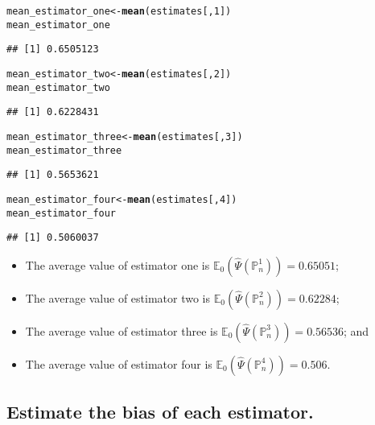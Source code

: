 \documentclass{article}\usepackage[]{graphicx}\usepackage[]{xcolor}
\makeatletter
\newcommand{\hlnum}[1]{\textcolor[rgb]{0.686,0.059,0.569}{#1}}%
\newcommand{\hlstd}[1]{\textcolor[rgb]{0.345,0.345,0.345}{#1}}%
\newcommand{\hlkwb}[1]{\textcolor[rgb]{0.69,0.353,0.396}{#1}}%
\newcommand{\hlkwd}[1]{\textcolor[rgb]{0.737,0.353,0.396}{\textbf{#1}}}%
\newenvironment{kframe}{%
 \def\at@end@of@kframe{}%
 \ifinner\ifhmode%
  \def\at@end@of@kframe{\end{minipage}}%
  \begin{minipage}{\columnwidth}%
 \fi\fi%
 \def\FrameCommand##1{\hskip\@totalleftmargin \hskip-\fboxsep
 \colorbox{shadecolor}{##1}\hskip-\fboxsep
     \hskip-\linewidth \hskip-\@totalleftmargin \hskip\columnwidth}%
 \MakeFramed {\advance\hsize-\width
   \@totalleftmargin\z@ \linewidth\hsize
   \@setminipage}}%
 {\par\unskip\endMakeFramed%
 \at@end@of@kframe}
\newenvironment{knitrout}{}{} %
\makeatother
\begin{document}
\begin{knitrout}
\color{fgcolor}\begin{kframe}
\begin{alltt}
\hlstd{mean_estimator_one} \hlkwb{<-} \hlkwd{mean}\hlstd{(estimates[,}\hlnum{1}\hlstd{])}
\hlstd{mean_estimator_one}
\end{alltt}
\begin{verbatim}
## [1] 0.6505123
\end{verbatim}
\begin{alltt}
\hlstd{mean_estimator_two} \hlkwb{<-} \hlkwd{mean}\hlstd{(estimates[,}\hlnum{2}\hlstd{])}
\hlstd{mean_estimator_two}
\end{alltt}
\begin{verbatim}
## [1] 0.6228431
\end{verbatim}
\begin{alltt}
\hlstd{mean_estimator_three} \hlkwb{<-} \hlkwd{mean}\hlstd{(estimates[,}\hlnum{3}\hlstd{])}
\hlstd{mean_estimator_three}
\end{alltt}
\begin{verbatim}
## [1] 0.5653621
\end{verbatim}
\begin{alltt}
\hlstd{mean_estimator_four} \hlkwb{<-} \hlkwd{mean}\hlstd{(estimates[,}\hlnum{4}\hlstd{])}
\hlstd{mean_estimator_four}
\end{alltt}
\begin{verbatim}
## [1] 0.5060037
\end{verbatim}
\end{kframe}
\end{knitrout}


\begin{itemize}
  \item The average value of estimator one is $\mathbb{E}_0(\hat{\Psi}(\mathbb{P}_n^1))=0.65051$;
  \item The average value of estimator two is $\mathbb{E}_0(\hat{\Psi}(\mathbb{P}_n^2))=0.62284$;
  \item The average value of estimator three is $\mathbb{E}_0(\hat{\Psi}(\mathbb{P}_n^3))=0.56536$; and
  \item The average value of estimator four is $\mathbb{E}_0(\hat{\Psi}(\mathbb{P}_n^4))=0.506$.
\end{itemize}

  \subsection{Estimate the bias of each estimator.}
  
\end{document}
